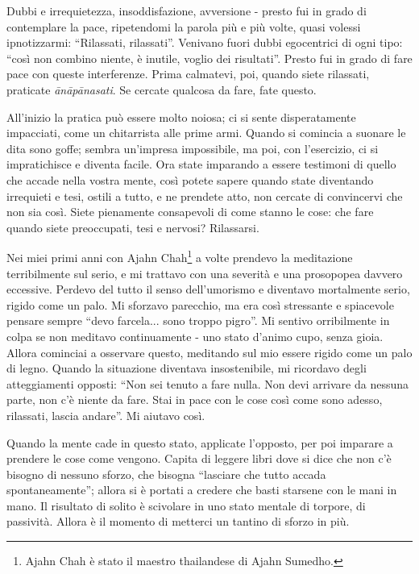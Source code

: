 Dubbi e irrequietezza, insoddisfazione, avversione - presto fui in grado
di contemplare la pace, ripetendomi la parola più e più volte, quasi
volessi ipnotizzarmi: ``Rilassati, rilassati''. Venivano fuori dubbi
egocentrici di ogni tipo: ``così non combino niente, è inutile, voglio
dei risultati''. Presto fui in grado di fare pace con queste
interferenze. Prima calmatevi, poi, quando siete rilassati, praticate
\textit{ānāpānasati}. Se cercate qualcosa da fare, fate questo.

All'inizio la pratica può essere molto noiosa; ci si sente
disperatamente impacciati, come un chitarrista alle prime armi. Quando
si comincia a suonare le dita sono goffe; sembra un'impresa impossibile,
ma poi, con l'esercizio, ci si impratichisce e diventa facile. Ora state
imparando a essere testimoni di quello che accade nella vostra mente,
così potete sapere quando state diventando irrequieti e tesi, ostili a
tutto, e ne prendete atto, non cercate di convincervi che non sia così.
Siete pienamente consapevoli di come stanno le cose: che fare quando
siete preoccupati, tesi e nervosi? Rilassarsi.

Nei miei primi anni con Ajahn Chah\footnote{Ajahn Chah è stato il maestro thailandese di Ajahn
Sumedho.} a volte prendevo la
meditazione terribilmente sul serio, e mi trattavo con una severità e
una prosopopea davvero eccessive. Perdevo del tutto il senso
dell'umorismo e diventavo mortalmente serio, rigido come un palo. Mi
sforzavo parecchio, ma era così stressante e spiacevole pensare sempre
``devo farcela... sono troppo pigro''. Mi sentivo orribilmente in colpa se
non meditavo continuamente - uno stato d'animo cupo, senza gioia. Allora
cominciai a osservare questo, meditando sul mio essere rigido come un
palo di legno. Quando la situazione diventava insostenibile, mi
ricordavo degli atteggiamenti opposti: ``Non sei tenuto a fare nulla. Non
devi arrivare da nessuna parte, non c'è niente da fare. Stai in pace con
le cose così come sono adesso, rilassati, lascia andare''. Mi aiutavo
così.

Quando la mente cade in questo stato, applicate l'opposto, per poi
imparare a prendere le cose come vengono. Capita di leggere libri dove
si dice che non c'è bisogno di nessuno sforzo, che bisogna ``lasciare che
tutto accada spontaneamente''; allora si è portati a credere che basti
starsene con le mani in mano. Il risultato di solito è scivolare in uno
stato mentale di torpore, di passività. Allora è il momento di metterci
un tantino di sforzo in più.

